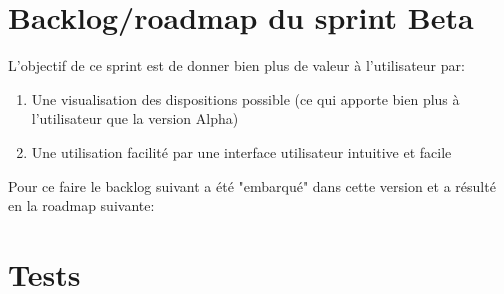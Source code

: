 \section{Backlog/roadmap du sprint Beta}

L’objectif de ce sprint est de donner bien plus de valeur à l'utilisateur par:
\begin{enumerate}
    \item Une visualisation des dispositions possible (ce qui apporte bien plus à l'utilisateur que la version Alpha)
    \item Une utilisation facilité par une interface utilisateur intuitive et facile
\end{enumerate}

Pour ce faire le backlog suivant a été "embarqué" dans cette version et a résulté en la roadmap suivante:


\section{Tests}


